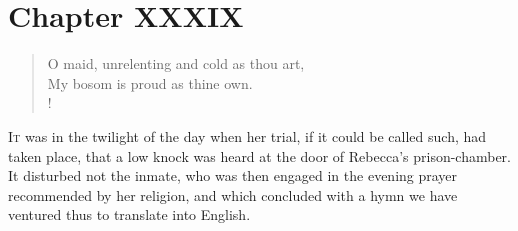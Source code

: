 \chapter{Chapter XXXIX}

\begin{verse}
O maid, unrelenting and cold as thou art,\\
My bosom is proud as thine own.\\!
\end{verse}

\lettrine{I}{t} was in the twilight of the day when her trial, if it
could be called
such, had taken place, that a low knock was heard at the door of
Rebecca's prison-chamber. It disturbed not the inmate, who was then
engaged in the evening prayer recommended by her religion, and which
concluded with a hymn we have ventured thus to translate into English.

